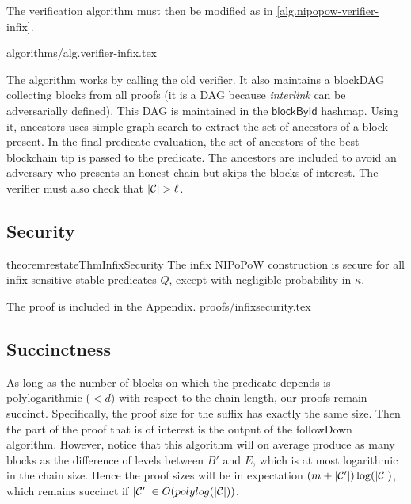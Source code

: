 The verification algorithm must then be modified as in
\ref{alg.nipopow-verifier-infix}.

{algorithms/alg.verifier-infix.tex}

The algorithm works by calling the old verifier. It also maintains a blockDAG
collecting blocks from all proofs (it is a DAG because \textit{interlink} can be
adversarially defined). This DAG is maintained in the $\textsf{blockById}$
hashmap. Using it, \textsf{ancestors} uses simple graph search to extract the
set of ancestors of a block present. In the final predicate evaluation, the set
of ancestors of the best blockchain tip is passed to the predicate. The
ancestors are included to avoid an adversary who presents an honest chain but
skips the blocks of interest. The verifier must also check that $|\mathcal{C}| >
\ell$.

\subsection{Security}
\begin{restatable}{theorem}{restateThmInfixSecurity}
The infix NIPoPoW construction is secure for all infix-sensitive stable
predicates $Q$, except with negligible probability in $\kappa$.
\end{restatable}

The proof is included in the Appendix.
\ifonecolumn
{proofs/infixsecurity.tex}
\fi

\subsection{Succinctness}
As long as the number of blocks on which the predicate depends is
polylogarithmic ($< d$) with respect to the chain length, our proofs remain
succinct. Specifically, the proof size for the suffix has exactly the same size.
Then the part of the proof that is of interest is the output of the followDown
algorithm. However, notice that this algorithm will on average produce as many
blocks as the difference of levels between $B'$ and $E$, which is at most
logarithmic in the chain size. Hence the proof sizes will be in expectation $(m +
|\mathcal{C}'|)\log(|\mathcal{C}|)$, which remains succinct if $|\mathcal{C}'| \in
O(polylog(|\mathcal{C}|))$.
